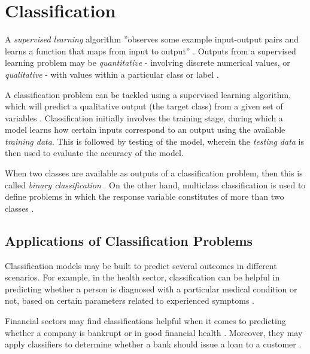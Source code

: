 \chapter[Classification]{Classification}
\label{ch:classification}

A \textit{supervised learning} algorithm ''observes some example input-output pairs and learns a function that maps from input to output'' \citep{russel2016}. Outputs from a supervised learning problem may be \textit{quantitative} - involving discrete numerical values, or \textit{qualitative} - with values within a particular class or label \citep{james2006}.

A classification problem can be tackled using a supervised learning algorithm, which will predict a qualitative output (the target class) from a given set of variables \citep{russel2016}. Classification initially involves the training stage, during which a model learns how certain inputs correspond to an output using the available \textit{training data}. This is followed by testing of the model, wherein the \textit{testing data} is then used to evaluate the accuracy of the model.

When two classes are available as outputs of a classification problem, then this is called \textit{binary classification} \citep{neelamegam2013}. On the other hand, multiclass classification is used to define problems in which the response variable constitutes of more than two classes \citep{aly2005}.

\section{Applications of Classification Problems}
\label{sec:applications}

Classification models may be built to predict several outcomes in different scenarios. For example, in the health sector, classification can be helpful in predicting whether a person is diagnosed with a particular medical condition or not, based on certain parameters related to experienced symptoms \citep{venkata2011,alzahani2015}.

Financial sectors may find classifications helpful when it comes to predicting whether a company is bankrupt or in good financial health \citep{moradi2012}. Moreover, they may apply classifiers to determine whether a bank should issue a loan to a customer \citep{thomas2000}.

